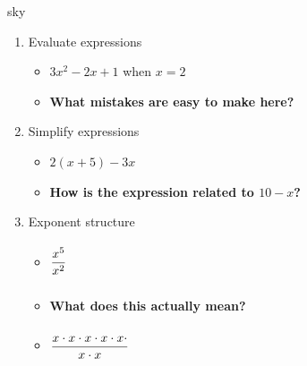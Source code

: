 \documentclass[10pt]{article}
\newcommand{\TallMath}[1]{$\displaystyle #1\rule[-1.4em]{0pt}{3.2em}$}
\begin{document}
    \renewcommand{\arraystretch}{1.6}
    \begin{skillbox}[Lesson]{sky}
        \begin{multicols}{2}
            \begin{enumerate}
                \item Evaluate expressions
                \begin{itemize}
                    \item $3x^2-2x+1$ when $x=2$
                    \item \textbf{What mistakes are easy to make here?}
                \end{itemize}

                \item Simplify expressions
                \begin{itemize}
                    \item $2\left(x+5\right)-3x$
                    \item \textbf{How is the expression related to $10-x$?}
                \end{itemize}

                \item Exponent structure
                \begin{itemize}
                    \item \TallMath{\frac{x^5}{x^2}}
                    \item \textbf{What does this actually mean?}
                    \item \TallMath{\frac{x\cdot x\cdot x\cdot x\cdot x\cdot}{x\cdot x}}
                \end{itemize}
            \end{enumerate}
        \end{multicols}
    \end{skillbox}
\end{document}
